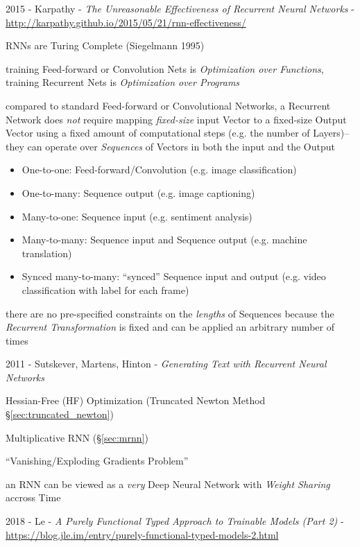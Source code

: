 \asterism

2015 - Karpathy - \emph{The Unreasonable Effectiveness of Recurrent Neural
  Networks} -
\url{http://karpathy.github.io/2015/05/21/rnn-effectiveness/}

RNNs are Turing Complete (Siegelmann 1995)

training Feed-forward or Convolution Nets is \emph{Optimization over
  Functions}, training Recurrent Nets is \emph{Optimization over Programs}

compared to standard Feed-forward or Convolutional Networks, a Recurrent Network
does \emph{not} require mapping \emph{fixed-size} input Vector to a fixed-size
Output Vector using a fixed amount of computational steps (e.g. the number of
Layers)-- they can operate over \emph{Sequences} of Vectors in both the input
and the Output
\begin{itemize}
  \item One-to-one: Feed-forward/Convolution (e.g. image classification)
  \item One-to-many: Sequence output (e.g. image captioning)
  \item Many-to-one: Sequence input (e.g. sentiment analysis)
  \item Many-to-many: Sequence input and Sequence output (e.g. machine
    translation)
  \item Synced many-to-many: ``synced'' Sequence input and output (e.g. video
    classification with label for each frame)
\end{itemize}
there are no pre-specified constraints on the \emph{lengths} of Sequences
because the \emph{Recurrent Transformation} is fixed and can be applied an
arbitrary number of times

\asterism

2011 - Sutskever, Martens, Hinton -
  \emph{Generating Text with Recurrent Neural Networks}

Hessian-Free (HF) Optimization (Truncated Newton Method
\S\ref{sec:truncated_newton})

Multiplicative RNN (\S\ref{sec:mrnn})

``Vanishing/Exploding Gradients Problem''

an RNN can be viewed as a \emph{very} Deep Neural Network with \emph{Weight
  Sharing} accross Time

\asterism

2018 - Le -
\emph{A Purely Functional Typed Approach to Trainable Models (Part 2)} -
\url{https://blog.jle.im/entry/purely-functional-typed-models-2.html}

